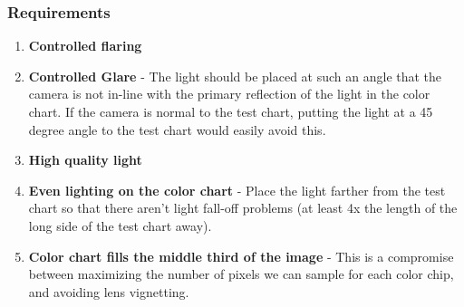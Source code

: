 \documentclass[twoside]{article}
\begin{document}
\subsubsection*{Requirements}
\begin{enumerate}
    \item \textbf{Controlled flaring}
    \item \textbf{Controlled Glare} - The light should be placed at such an angle that the camera is not in-line with the primary reflection of the light in the color chart. If the camera is normal to the test chart, putting the light at a 45 degree angle to the test chart would easily avoid this.
    \item \textbf{High quality light}
    \item \textbf{Even lighting on the color chart} - Place the light farther from the test chart so that there aren't light fall-off problems (at least 4x the length of the long side of the test chart away).
    \item \textbf{Color chart fills the middle third of the image} - This is a compromise between maximizing the number of pixels we can sample for each color chip, and avoiding lens vignetting.
\end{enumerate}

\end{document}
